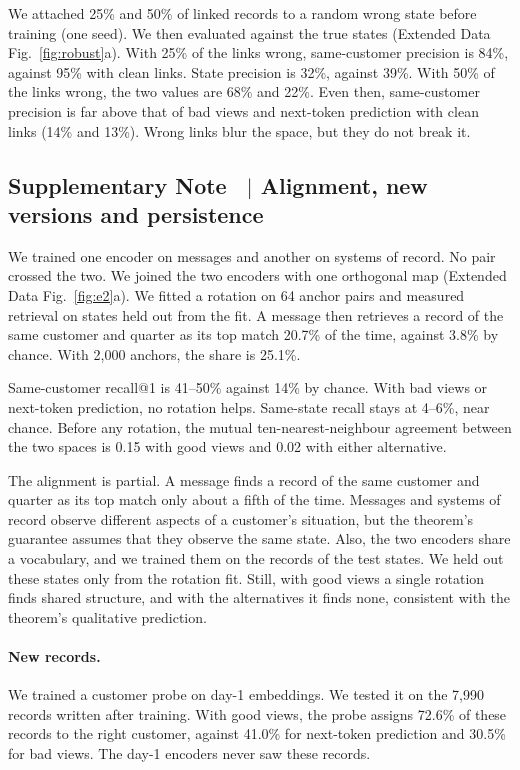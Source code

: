 \documentclass[11pt]{article}
\newcounter{suppnote}
\newcommand{\suppnote}[2]{\refstepcounter{suppnote}\label{#2}\subsection{Supplementary Note \thesuppnote\ $|$ #1}}
\begin{document}
We attached 25\% and 50\% of linked records to a random wrong state before training (one seed). We then evaluated against the true states (Extended Data Fig.~\ref{fig:robust}a). With 25\% of the links wrong, same-customer precision is 84\%, against 95\% with clean links. State precision is 32\%, against 39\%. With 50\% of the links wrong, the two values are 68\% and 22\%. Even then, same-customer precision is far above that of bad views and next-token prediction with clean links (14\% and 13\%). Wrong links blur the space, but they do not break it.

\suppnote{Alignment, new versions and persistence}{sec:e2}
\label{sec:e3}
We trained one encoder on messages and another on systems of record. No pair crossed the two. We joined the two encoders with one orthogonal map (Extended Data Fig.~\ref{fig:e2}a). We fitted a rotation on 64 anchor pairs and measured retrieval on states held out from the fit. A message then retrieves a record of the same customer and quarter as its top match 20.7\% of the time, against 3.8\% by chance. With 2{,}000 anchors, the share is 25.1\%.

Same-customer recall@1 is 41--50\% against 14\% by chance. With bad views or next-token prediction, no rotation helps. Same-state recall stays at 4--6\%, near chance. Before any rotation, the mutual ten-nearest-neighbour agreement between the two spaces is 0.15 with good views and 0.02 with either alternative.

The alignment is partial. A message finds a record of the same customer and quarter as its top match only about a fifth of the time. Messages and systems of record observe different aspects of a customer's situation, but the theorem's guarantee assumes that they observe the same state. Also, the two encoders share a vocabulary, and we trained them on the records of the test states. We held out these states only from the rotation fit. Still, with good views a single rotation finds shared structure, and with the alternatives it finds none, consistent with the theorem's qualitative prediction.

\paragraph{New records.} We trained a customer probe on day-1 embeddings. We tested it on the 7{,}990 records written after training. With good views, the probe assigns 72.6\% of these records to the right customer, against 41.0\% for next-token prediction and 30.5\% for bad views. The day-1 encoders never saw these records.
\end{document}

